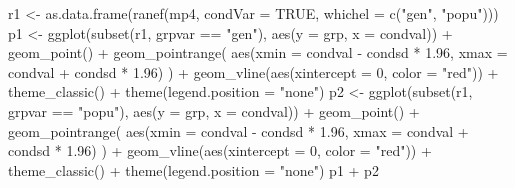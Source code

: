 \documentclass[
  12pt,
]{book}
\newenvironment{Shaded}{\begin{snugshade}}{\end{snugshade}}
\newcommand{\AttributeTok}[1]{\textcolor[rgb]{0.77,0.63,0.00}{#1}}
\newcommand{\ConstantTok}[1]{\textcolor[rgb]{0.00,0.00,0.00}{#1}}
\newcommand{\DecValTok}[1]{\textcolor[rgb]{0.00,0.00,0.81}{#1}}
\newcommand{\FloatTok}[1]{\textcolor[rgb]{0.00,0.00,0.81}{#1}}
\newcommand{\FunctionTok}[1]{\textcolor[rgb]{0.00,0.00,0.00}{#1}}
\newcommand{\NormalTok}[1]{#1}
\newcommand{\OtherTok}[1]{\textcolor[rgb]{0.56,0.35,0.01}{#1}}
\newcommand{\SpecialCharTok}[1]{\textcolor[rgb]{0.00,0.00,0.00}{#1}}
\newcommand{\StringTok}[1]{\textcolor[rgb]{0.31,0.60,0.02}{#1}}
\begin{document}
\begin{Shaded}
\begin{Highlighting}[]
\NormalTok{r1 }\OtherTok{\textless{}{-}} \FunctionTok{as.data.frame}\NormalTok{(}\FunctionTok{ranef}\NormalTok{(mp4, }\AttributeTok{condVar =} \ConstantTok{TRUE}\NormalTok{, }\AttributeTok{whichel =} \FunctionTok{c}\NormalTok{(}\StringTok{"gen"}\NormalTok{, }\StringTok{"popu"}\NormalTok{)))}
\NormalTok{p1 }\OtherTok{\textless{}{-}} \FunctionTok{ggplot}\NormalTok{(}\FunctionTok{subset}\NormalTok{(r1, grpvar }\SpecialCharTok{==} \StringTok{"gen"}\NormalTok{), }\FunctionTok{aes}\NormalTok{(}\AttributeTok{y =}\NormalTok{ grp, }\AttributeTok{x =}\NormalTok{ condval)) }\SpecialCharTok{+}
  \FunctionTok{geom\_point}\NormalTok{() }\SpecialCharTok{+}
  \FunctionTok{geom\_pointrange}\NormalTok{(}
    \FunctionTok{aes}\NormalTok{(}\AttributeTok{xmin =}\NormalTok{ condval }\SpecialCharTok{{-}}\NormalTok{ condsd }\SpecialCharTok{*} \FloatTok{1.96}\NormalTok{, }\AttributeTok{xmax =}\NormalTok{ condval }\SpecialCharTok{+}\NormalTok{ condsd }\SpecialCharTok{*} \FloatTok{1.96}\NormalTok{)}
\NormalTok{  ) }\SpecialCharTok{+}
  \FunctionTok{geom\_vline}\NormalTok{(}\FunctionTok{aes}\NormalTok{(}\AttributeTok{xintercept =} \DecValTok{0}\NormalTok{, }\AttributeTok{color =} \StringTok{"red"}\NormalTok{)) }\SpecialCharTok{+}
  \FunctionTok{theme\_classic}\NormalTok{() }\SpecialCharTok{+}
  \FunctionTok{theme}\NormalTok{(}\AttributeTok{legend.position =} \StringTok{"none"}\NormalTok{)}
\NormalTok{p2 }\OtherTok{\textless{}{-}} \FunctionTok{ggplot}\NormalTok{(}\FunctionTok{subset}\NormalTok{(r1, grpvar }\SpecialCharTok{==} \StringTok{"popu"}\NormalTok{), }\FunctionTok{aes}\NormalTok{(}\AttributeTok{y =}\NormalTok{ grp, }\AttributeTok{x =}\NormalTok{ condval)) }\SpecialCharTok{+}
  \FunctionTok{geom\_point}\NormalTok{() }\SpecialCharTok{+}
  \FunctionTok{geom\_pointrange}\NormalTok{(}
    \FunctionTok{aes}\NormalTok{(}\AttributeTok{xmin =}\NormalTok{ condval }\SpecialCharTok{{-}}\NormalTok{ condsd }\SpecialCharTok{*} \FloatTok{1.96}\NormalTok{, }\AttributeTok{xmax =}\NormalTok{ condval }\SpecialCharTok{+}\NormalTok{ condsd }\SpecialCharTok{*} \FloatTok{1.96}\NormalTok{)}
\NormalTok{  ) }\SpecialCharTok{+}
  \FunctionTok{geom\_vline}\NormalTok{(}\FunctionTok{aes}\NormalTok{(}\AttributeTok{xintercept =} \DecValTok{0}\NormalTok{, }\AttributeTok{color =} \StringTok{"red"}\NormalTok{)) }\SpecialCharTok{+}
  \FunctionTok{theme\_classic}\NormalTok{() }\SpecialCharTok{+}
  \FunctionTok{theme}\NormalTok{(}\AttributeTok{legend.position =} \StringTok{"none"}\NormalTok{)}
\NormalTok{p1 }\SpecialCharTok{+}\NormalTok{ p2}
\end{Highlighting}
\end{Shaded}
\end{document}
